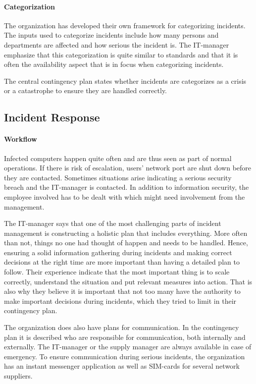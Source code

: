 \paragraph{Categorization}
The organization has developed their own framework for categorizing incidents. The inputs used to categorize incidents include how many persons and departments are affected and how serious the incident is. The IT-manager emphasize that this categorization is quite similar to standards and that it is often the availability aspect that is in focus when categorizing incidents.

The central contingency plan states whether incidents are categorizes as a crisis or a catastrophe to ensure they are handled correctly.

\subsection{Incident Response}
\paragraph{Workflow}
Infected computers happen quite often and are thus seen as part of normal operations. If there is risk of escalation, users' network port are shut down before they are contacted. Sometimes situations arise indicating a serious security breach and the IT-manager is contacted. In addition to information security, the employee involved has to be dealt with which might need involvement from the management.

The IT-manager says that one of the most challenging parts of incident management is constructing a holistic plan that includes everything. More often than not, things no one had thought of happen and needs to be handled. Hence, ensuring a solid information gathering during incidents and making correct decisions at the right time are more important than having a detailed plan to follow. Their experience indicate that the most important thing is to scale correctly, understand the situation and put relevant measures into action. That is also why they believe it is important that not too many have the authority to make important decisions during incidents, which they tried to limit in their contingency plan.

The organization does also have plans for communication. In the contingency plan it is described who are responsible for communication, both internally and externally. The IT-manager or the supply manager are always available in case of emergency. To ensure communication during serious incidents, the organization has an instant messenger application as well as SIM-cards for several network suppliers. 

